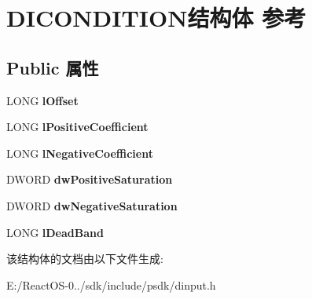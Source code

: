 \hypertarget{struct_d_i_c_o_n_d_i_t_i_o_n}{}\section{D\+I\+C\+O\+N\+D\+I\+T\+I\+O\+N结构体 参考}
\label{struct_d_i_c_o_n_d_i_t_i_o_n}
\subsection*{Public 属性}
\begin{DoxyCompactItemize}
\item 
\mbox{\label{struct_d_i_c_o_n_d_i_t_i_o_n_a093288dba736d9c48f725d6ad547e21f}} 
L\+O\+NG {\bfseries l\+Offset}
\item 
\mbox{\label{struct_d_i_c_o_n_d_i_t_i_o_n_a868c8158f884abc8ee3b10cd4c5e608e}} 
L\+O\+NG {\bfseries l\+Positive\+Coefficient}
\item 
\mbox{\label{struct_d_i_c_o_n_d_i_t_i_o_n_a493c1cf39114314318be0fbea6f7d3a8}} 
L\+O\+NG {\bfseries l\+Negative\+Coefficient}
\item 
\mbox{\label{struct_d_i_c_o_n_d_i_t_i_o_n_a0fd65390fbd1c57fec0b24f92d280d23}} 
D\+W\+O\+RD {\bfseries dw\+Positive\+Saturation}
\item 
\mbox{\label{struct_d_i_c_o_n_d_i_t_i_o_n_a38850774c36815979f3e6ae443984b22}} 
D\+W\+O\+RD {\bfseries dw\+Negative\+Saturation}
\item 
\mbox{\label{struct_d_i_c_o_n_d_i_t_i_o_n_ab926e8ea4ee58d043368cc74dc61333a}} 
L\+O\+NG {\bfseries l\+Dead\+Band}
\end{DoxyCompactItemize}


该结构体的文档由以下文件生成\+:\begin{DoxyCompactItemize}
\item 
E\+:/\+React\+O\+S-\/0../sdk/include/psdk/dinput.\+h\end{DoxyCompactItemize}
